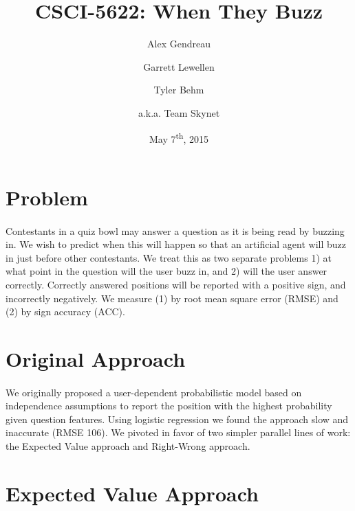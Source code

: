 \documentclass[letterpaper]{article}
\begin{document}
\title{CSCI-5622: When They Buzz}
\author{Alex Gendreau \and Garrett Lewellen \and Tyler Behm \and a.k.a. Team Skynet}
\date{May 7\textsuperscript{th}, 2015}

\maketitle

\section{Problem}

\paragraph{} Contestants in a quiz bowl may answer a question as it is being read by buzzing in. We wish to predict when this will happen so that an artificial agent will buzz in just before other contestants. We treat this as two separate problems 1) at what point in the question will the user buzz in, and 2) will the user answer correctly. Correctly answered positions will be reported with a positive sign, and incorrectly negatively. We measure (1) by root mean square error (RMSE) and (2) by sign accuracy (ACC).

\section{Original Approach}

\paragraph{} We originally proposed a user-dependent probabilistic model based on independence assumptions to report the position with the highest probability given question features. Using logistic regression we found the approach slow and inaccurate (RMSE 106). We pivoted in favor of two simpler parallel lines of work: the Expected Value approach and Right-Wrong approach.

\section{Expected Value Approach}
\end{document}
